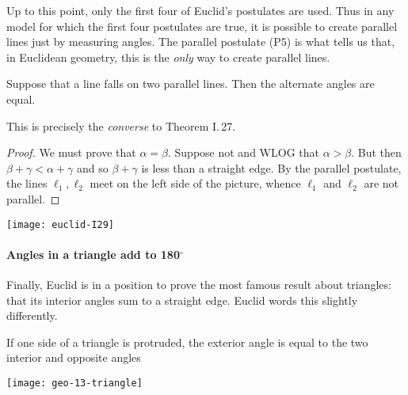 \noindent Up to this point, only the first four of Euclid's postulates are used. Thus in any model for which the first four postulates are true, it is possible to create parallel lines just by measuring angles. The parallel postulate (P5) is what tells us that, in Euclidean geometry, this is the \emph{only} way to create parallel lines.

\begin{thm*}[I.\,29]
Suppose that a line falls on two parallel lines. Then the alternate angles are equal.
\end{thm*}

\noindent This is precisely the \emph{converse} to Theorem I.\,27.

\noindent\begin{minipage}[t]{0.55\textwidth}\vspace{0pt}
\begin{proof}
We must prove that $\alpha=\beta$. Suppose not and WLOG that $\alpha>\beta$. But then $\beta+\gamma<\alpha+\gamma$ and so $\beta+\gamma$ is less than a straight edge. By the parallel postulate, the lines $\ell_1,\ell_2$ meet on the left side of the picture, whence $\ell_1$ and $\ell_2$ are not parallel.
\end{proof}
\end{minipage}\hfill
\begin{minipage}[t]{0.4\textwidth}\vspace{0pt}
\flushright\texttt{[image: euclid-I29]}
\end{minipage}

\paragraph{Angles in a triangle add to 180$^\circ$}

Finally, Euclid is in a position to prove the most famous result about triangles: that its interior angles sum to a straight edge. Euclid words this slightly differently.

\noindent\begin{minipage}[t]{0.55\textwidth}\vspace{0pt}
\begin{thm*}[I.\,32]
 If one side of a triangle is protruded, the exterior angle is equal to the two interior and opposite angles
\end{thm*}
\end{minipage}\hfill
\begin{minipage}[t]{0.4\textwidth}\vspace{0pt}
\flushright\texttt{[image: geo-13-triangle]}
\end{minipage}\\[10pt]

